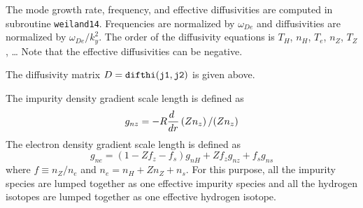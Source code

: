 The mode growth rate, frequency, and effective diffusivities are
computed in subroutine {\tt weiland14}.
Frequencies are normalized by $\omega_{De}$ and diffusivities are
normalized by $ \omega_{De} / k_y^2 $.
The order of the diffusivity equations is
$ T_H $, $ n_H $, $ T_e $, $ n_Z $, $ T_Z $, \ldots
Note that the effective diffusivities can be negative.

The diffusivity matrix $ D = {\tt difthi(j1,j2)}$
is given above.


The impurity density gradient scale length is defined as
$$g_{nz}=-R{{d\ }\over {dr}}\left(Zn_z\right)/(Zn_z)$$
The electron density gradient scale length is defined as
$$g_{ne}=(1-Zf_z-f_s)g_{nH}+Zf_zg_{nz}+f_sg_{ns}$$
where $ f \equiv n_Z / n_e $ and $ n_e = n_H + Z n_Z +n_s$.
For this purpose, all the impurity species are lumped together as
one effective impurity species and all the hydrogen isotopes are lumped
together as one effective hydrogen isotope.


